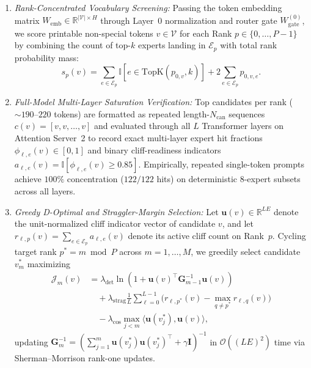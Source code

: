 \documentclass[11pt,a4paper]{article}
\renewcommand{\_}{\textunderscore\allowbreak}
\theoremstyle{definition}
\theoremstyle{remark}
\begin{document}
\begin{enumerate}
  \item \emph{Rank-Concentrated Vocabulary Screening:} Passing the token embedding matrix $W_{\mathrm{emb}} \in \mathbb{R}^{|\mathcal{V}| \times H}$ through Layer~0 normalization and router gate $W_{\mathrm{gate}}^{(0)}$, we score printable non-special tokens $v \in \mathcal{V}$ for each Rank $p \in \{0, \dots, P-1\}$ by combining the count of top-$k$ experts landing in $\mathcal{E}_p$ with total rank probability mass:
  \begin{equation}
    s_p(v) = \sum_{e \in \mathcal{E}_p} \mathbb{I}[e \in \mathrm{TopK}(p_{0, v}, k)] + 2 \sum_{e \in \mathcal{E}_p} p_{0, v, e}.
  \end{equation}
  \item \emph{Full-Model Multi-Layer Saturation Verification:} Top candidates per rank ($\sim 190$--$220$ tokens) are formatted as repeated length-$N_{\mathrm{can}}$ sequences $c(v) = [v, v, \dots, v]$ and evaluated through all $L$ Transformer layers on Attention Server~2 to record exact multi-layer expert hit fractions $\phi_{\ell, e}(v) \in [0, 1]$ and binary cliff-readiness indicators $a_{\ell, e}(v) = \mathbb{I}[\phi_{\ell, e}(v) \ge 0.85]$. Empirically, repeated single-token prompts achieve $100\%$ concentration ($122/122$ hits) on deterministic 8-expert subsets across all layers.
  \item \emph{Greedy D-Optimal and Straggler-Margin Selection:} Let $\mathbf{u}(v) \in \mathbb{R}^{L E}$ denote the unit-normalized cliff indicator vector of candidate $v$, and let $r_{\ell, p}(v) = \sum_{e \in \mathcal{E}_p} a_{\ell, e}(v)$ denote its active cliff count on Rank~$p$. Cycling target rank $p^* = m \bmod P$ across $m = 1, \dots, M$, we greedily select candidate $v_m^*$ maximizing
  \begin{align}\label{eq:d_optimal}
    \mathcal{J}_m(v) &= \lambda_{\mathrm{det}} \ln\!\left(1 + \mathbf{u}(v)^\top \mathbf{G}_{m-1}^{-1} \mathbf{u}(v)\right) \nonumber\\
    &\quad + \lambda_{\mathrm{strag}} \frac{1}{L} \sum_{\ell=0}^{L-1} \Big(r_{\ell, p^*}(v) - \max_{q \neq p^*} r_{\ell, q}(v)\Big) \nonumber\\
    &\quad - \lambda_{\mathrm{cos}} \max_{j < m} \langle \mathbf{u}(v_j^*), \mathbf{u}(v) \rangle,
  \end{align}
  updating $\mathbf{G}_m^{-1} = (\sum_{j=1}^m \mathbf{u}(v_j^*)\mathbf{u}(v_j^*)^\top + \gamma \mathbf{I})^{-1}$ in $\mathcal{O}((LE)^2)$ time via Sherman--Morrison rank-one updates.
\end{enumerate}
\end{document}
